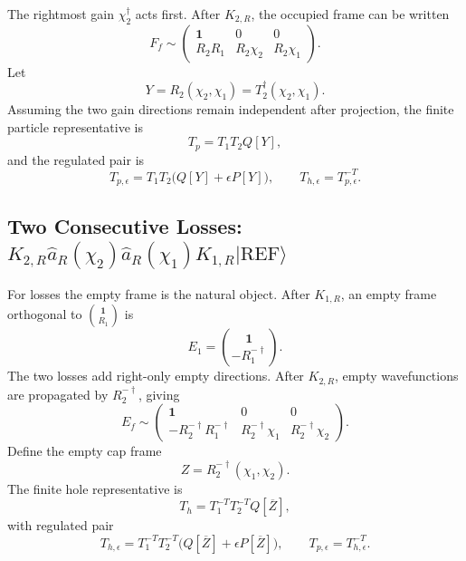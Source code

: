 \documentclass[aps,prb,onecolumn,nofootinbib,superscriptaddress]{revtex4-2}
\newcommand{\Id}{\mathbf{1}}
\newcommand{\REF}{\mathrm{REF}}
\newcommand{\ket}[1]{\lvert #1\rangle}
\newcommand{\ahat}{\hat a}
\newcommand{\eps}{\epsilon}
\begin{document}
The rightmost gain \(\chi_2^\dagger\) acts first.  After \(K_{2,R}\), the
occupied frame can be written
\begin{equation}
  F_f\sim
  \begin{pmatrix}
    \Id & 0 & 0\\
    R_2R_1 & R_2\chi_2 & R_2\chi_1
  \end{pmatrix}.
\end{equation}
Let
\begin{equation}
  Y=R_2(\chi_2,\chi_1)=T_2^\dagger(\chi_2,\chi_1).
\end{equation}
Assuming the two gain directions remain independent after projection, the
finite particle representative is
\begin{equation}
  T_p=T_1T_2Q[Y],
\end{equation}
and the regulated pair is
\begin{equation}
  T_{p,\eps}=T_1T_2\bigl(Q[Y]+\eps P[Y]\bigr),
  \qquad
  T_{h,\eps}=T_{p,\eps}^{-T}.
  \label{eq:two-gains-regulated}
\end{equation}

\subsection{\texorpdfstring{Two Consecutive Losses: \(K_{2,R}\ahat_R(\chi_2)\ahat_R(\chi_1)K_{1,R}\ket{\REF}\)}{Two Consecutive Losses}}

For losses the empty frame is the natural object.  After \(K_{1,R}\), an
empty frame orthogonal to \(\binom{\Id}{R_1}\) is
\begin{equation}
  E_1=
  \binom{\Id}{-R_1^{-\dagger}}.
\end{equation}
The two losses add right-only empty directions.  After \(K_{2,R}\), empty
wavefunctions are propagated by \(R_2^{-\dagger}\), giving
\begin{equation}
  E_f\sim
  \begin{pmatrix}
    \Id & 0 & 0\\
    -R_2^{-\dagger}R_1^{-\dagger}
      & R_2^{-\dagger}\chi_1
      & R_2^{-\dagger}\chi_2
  \end{pmatrix}.
\end{equation}
Define the empty cap frame
\begin{equation}
  Z=R_2^{-\dagger}(\chi_1,\chi_2).
\end{equation}
The finite hole representative is
\begin{equation}
  T_h=T_1^{-T}T_2^{-T}Q[\overline Z],
\end{equation}
with regulated pair
\begin{equation}
  T_{h,\eps}
  =
  T_1^{-T}T_2^{-T}
  \bigl(Q[\overline Z]+\eps P[\overline Z]\bigr),
  \qquad
  T_{p,\eps}=T_{h,\eps}^{-T}.
  \label{eq:two-losses-regulated}
\end{equation}
\end{document}
